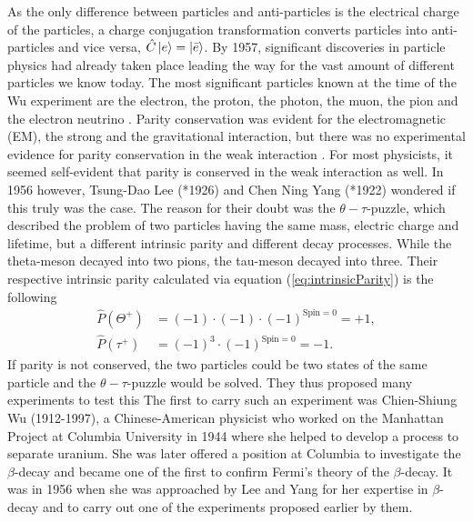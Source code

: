 As the only difference between particles and anti-particles is the electrical charge of the particles, a charge conjugation transformation converts particles into anti-particles and vice versa, $\hat C \ket{e} = \ket{\bar e}$.
\newline
By 1957, significant discoveries in particle physics had already taken place leading the way for the vast amount of different particles we know today.
The most significant particles known at the time of the Wu experiment are the electron, the proton, the photon, the muon, the pion and the electron neutrino \cite{Ward:2665175}.
Parity conservation was evident for the electromagnetic (EM), the strong and the gravitational interaction, but there was no experimental evidence for parity conservation in the weak interaction \cite{CaseStudies}.
For most physicists, it seemed self-evident that parity is conserved in the weak interaction as well.
In 1956 however, Tsung-Dao Lee (*1926) and Chen Ning Yang (*1922) wondered if this truly was the case.
The reason for their doubt was the $\theta-\tau$-puzzle, which described the problem of two particles having the same mass, electric charge and lifetime, but a different intrinsic parity and different decay processes.
While the theta-meson decayed into two pions, the tau-meson decayed into three.
Their respective intrinsic parity calculated via equation (\ref{eq:intrinsicParity}) is the following
\begin{align}
    \label{eq:calculatedParity}
    \hat P(\Theta^+) &= (-1)\cdot(-1)\cdot (-1)^{\text{Spin}=0}=+1, \\
    \hat P(\tau^+) &= (-1)^3\cdot (-1)^{\text{Spin}=0}=-1.
\end{align}
If parity is not conserved, the two particles could be two states of the same particle and the $\theta-\tau$-puzzle would be solved.
They thus proposed many experiments to test this \cite{PhysRev.104.254}
The first to carry such an experiment was Chien-Shiung Wu (1912-1997), a Chinese-American physicist who worked on the Manhattan Project at Columbia University in 1944 where she helped to develop a process to separate uranium.
She was later offered a position at Columbia to investigate the $\beta$-decay and became one of the first to confirm Fermi's theory of the $\beta$-decay.
It was in 1956 when she was approached by Lee and Yang for her expertise in $\beta$-decay and to carry out one of the experiments proposed earlier by them.

